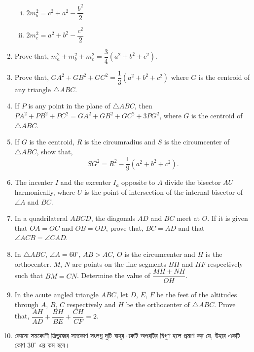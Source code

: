 \documentclass[11pt, a4paper]{article}
\begin{document}
\begin{enumerate}
\begin{enumerate}[(i)]
			\item $2m_b^2 = c^2 + a^2 - \dfrac{b^2}{2}$
		
			\item $2m_c^2 = a^2 + b^2 - \dfrac{c^2}{2}$
		\end{enumerate}
		
	\item Prove that, $m_a ^2 + m_b^2 + m_c^2 = \dfrac{3}{4}\left( a^2 + b^2 + c^2 \right)$.
	
	\item Prove that, $GA^2 + GB^2 + GC^2 = \dfrac{1}{3} \left(a^2 + b^2 + c^2 \right)$ where $G$ is the centroid of any triangle $\bigtriangleup ABC$.
	
	\item If $P$ is any point in the plane of $\bigtriangleup ABC$, then $PA^2 + PB^2 + PC^2 = GA^2 + GB^2 + GC^2 + 3PG^2$, where $G$ is the centroid of $\bigtriangleup ABC$.
	
	\item If $G$ is the centroid, $R$ is the circumradius and $S$ is the circumcenter of $\bigtriangleup ABC$, show that, $$SG^2 = R^2 - \dfrac{1}{9} \left( a^2 + b^2 + c^2 \right).$$
	
	\item The incenter $I$ and the excenter $I_a$ opposite to $A$ divide the bisector $AU$ harmonically, where $U$ is the point of intersection of the internal bisector of $\angle A$ and $BC$.
	
	\item In a quadrilateral $ABCD$, the diagonals $AD$ and $BC$ meet at $O$. If it is given that $OA = OC$ and $OB = OD$, prove that, $BC = AD$ and that $\angle ACB = \angle CAD$.
	
	\item In $\bigtriangleup ABC$, $\angle A = 60^{\circ}$, $AB > AC$, $O$ is the circumcenter and $H$ is the orthocenter. $M$, $N$ are points on the line segments $BH$ and $HF$ respectively such that $BM = CN$. Determine the value of $\dfrac{MH + NH}{OH}$.

	\item In the acute angled triangle $ABC$, let $D$, $E$, $F$ be the feet of the altitudes through $A$, $B$, $C$ respectively and $H$ be the orthocenter of $\bigtriangleup ABC$. Prove that, $\dfrac{AH}{AD} + \dfrac{BH}{BE} + \dfrac{CH}{CF} = 2$.
	
	\item \textbengali{কোনো সমকোণী ত্রিভুজের সমকোণ সংলগ্ন দুটি বাহুর একটি অপরটির দ্বিগুণ হলে প্রমাণ কর যে, উহার একটি কোণ} $30^{\circ}$ \textbengali{এর কম হবে।}
	

\end{enumerate}
\end{document}
